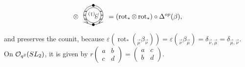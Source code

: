 \documentclass[11pt]{article}
\numberwithin{equation}{section}
\numberwithin{equation}{section}
\newcommand{\Oq}{\mathcal{O}_{q^2}({\rm SL}_2)}
\begin{document}
\begin{Definition}
\[\begin{tikzpicture}[scale = 1, baseline = -5pt]
\end{tikzpicture} \otimes \begin{tikzpicture}[scale = 1, baseline = -5pt]
\fill [gray!10] (0,0) circle (0.5);
\draw (0,0) circle (0.5);
\node[rotate = 135] at (-135:0.5) {\small $<$};
\node[rotate = -135] at (-45:0.5) {\small $>$};
\node at (0,-0.5){\small $\bullet$};
\node at (0,0.5){\small $\bullet$};
\draw [thick] (-0.5,0) -- (0.5,0);
\draw [thick] (-0.45,-0.2) -- (0.45,-0.2) ;
\draw [thick] (-0.45,0.2) -- (0.45,0.2);
\node[circle, rotate = 180, fill = white, draw = black, inner sep = 1pt] at (0,0) {\footnotesize $\beta_{(1)}$};
\end{tikzpicture} = (\operatorname{rot}_*\otimes \operatorname{rot}_*) \circ \Delta^{\rm op} (\beta),
\]
and preserves the counit, because $\varepsilon(\operatorname{rot}_*(_{\vec{\mu}}\beta_{\vec{\nu}})) = \varepsilon(_{\vec{\nu}}\beta_{\vec{\mu}}) = \delta_{\vec{\nu},\vec{\mu}} = \delta_{\vec{\mu},\vec{\nu}}$.
On $\Oq$, it is given by $r\left(\begin{smallmatrix}a&b\\c&d\end{smallmatrix}\right) = \left( \begin{smallmatrix}a&c\\b&d\end{smallmatrix}\right)$.
\end{Definition}
\end{document}
